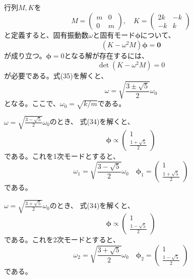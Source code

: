 \documentclass[a4paper]{jsarticle}
\begin{document}
\subsection{}
行列$M,K$を
\begin{equation}
  M =
  \begin{pmatrix}
    m & 0 \\
    0 & m
  \end{pmatrix},\quad
  K =
  \begin{pmatrix}
    2k & -k \\
    -k & k
  \end{pmatrix}
\end{equation}
と定義すると、固有振動数$\omega$と固有モード$\boldsymbol{\phi}$について、
\begin{equation}
  (K - \omega^2 M) \boldsymbol{\phi} = \boldsymbol{0}
\end{equation}
が成り立つ。$\boldsymbol{\phi} = 0$となる解が存在するには、
\begin{equation}
  \det (K - \omega^2 M) = 0
\end{equation}
が必要である。式(35)を解くと、
\begin{equation}
  \omega = \sqrt{\frac{3 \pm \sqrt{5}}{2}} \omega_0
\end{equation}
となる。ここで、$\omega_0 = \sqrt{k / m}$である。\par
$\omega = \sqrt{\frac{3 - \sqrt{5}}{2}} \omega_0$のとき、
式(34)を解くと、
\begin{equation}
  \boldsymbol{\phi} \propto
  \begin{pmatrix}
    1 \\
    \frac{1 + \sqrt{5}}{2}
  \end{pmatrix}
\end{equation}
である。これを1次モードとすると、
\begin{equation}
  \omega_1 = \sqrt{\frac{3 - \sqrt{5}}{2}} \omega_0 \quad
  \boldsymbol{\phi}_1 =
  \begin{pmatrix}
    1 \\
    \frac{1 + \sqrt{5}}{2}
  \end{pmatrix}
\end{equation}
である。\par
$\omega = \sqrt{\frac{3 + \sqrt{5}}{2}} \omega_0$のとき、
式(34)を解くと、
\begin{equation}
  \boldsymbol{\phi} \propto
  \begin{pmatrix}
    1 \\
    \frac{1 - \sqrt{5}}{2}
  \end{pmatrix}
\end{equation}
である。これを2次モードとすると、
\begin{equation}
  \omega_2 = \sqrt{\frac{3 + \sqrt{5}}{2}} \omega_0 \quad
  \boldsymbol{\phi}_2 =
  \begin{pmatrix}
    1 \\
    \frac{1 - \sqrt{5}}{2}
  \end{pmatrix}
\end{equation}
である。\par
\end{document}
